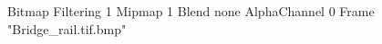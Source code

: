 {Bitmap
	{Filtering 1}
	{Mipmap 1}
	{Blend none}
	{AlphaChannel 0}
	{Frame "Bridge_rail.tif.bmp"}
}
